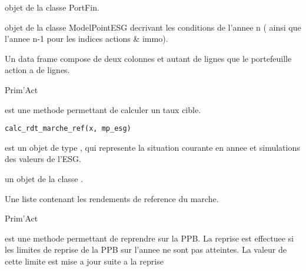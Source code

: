 \documentclass[a4paper]{book}
\begin{document}
%
\begin{Arguments}
\begin{ldescription}
\item[\code{x}] objet de la classe PortFin.

\item[\code{mp\_ESG}] objet de la classe ModelPointESG decrivant les conditions de l'annee n ( ainsi que l'annee n-1 pour les indices actions \& immo).
\end{ldescription}
\end{Arguments}
%
\begin{Value}
Un data frame compose de deux colonnes et autant de lignes que le portefeuille action a de lignes.
\end{Value}
%
\begin{Author}\relax
Prim'Act
\end{Author}
%
\begin{Description}\relax
{} est une methode permettant de calculer un taux cible.
\end{Description}
%
\begin{Usage}
\begin{verbatim}
calc_rdt_marche_ref(x, mp_esg)
\end{verbatim}
\end{Usage}
%
\begin{Arguments}
\begin{ldescription}
\item[\code{mp\_esg}] est un objet de type , qui represente la situation courante
en annee et simulations des valeurs de l'ESG.

\item[\code{param\_comport}] un objet de la classe .
\end{ldescription}
\end{Arguments}
%
\begin{Value}
Une liste contenant les rendements de reference du marche.
\end{Value}
%
\begin{Author}\relax
Prim'Act
\end{Author}
%
\begin{Description}\relax
{} est une methode permettant de reprendre sur la PPB.
La reprise est effectuee si les limites de reprise de la PPB sur l'annee ne sont pas atteintes. La valeur de cette limite est mise a jour suite a la reprise
\end{Description}
\end{document}
